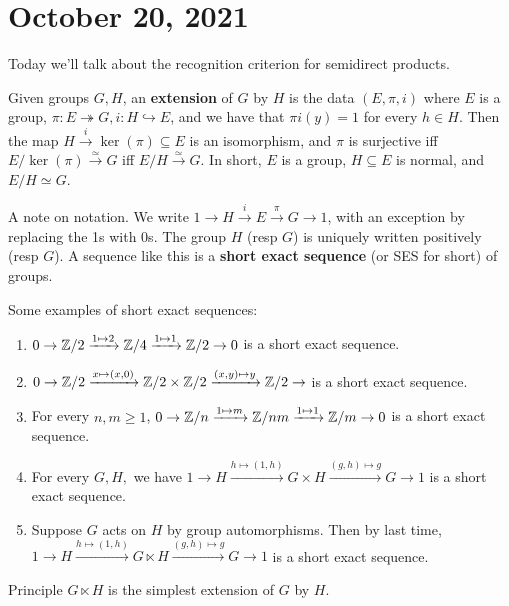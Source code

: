 \section{October 20, 2021} 
Today we'll talk about the recognition criterion for semidirect products.

\begin{definition}[]
    Given groups $G,H$, an \textbf{extension} of $G$ by $H$ is the data $(E,\pi,i)$ where $E$ is a group, $\pi \colon E \twoheadrightarrow G , i \colon H \hookrightarrow E $, and we have that $\pi i (y)=1$ for every $h \in H$. Then the map $H \xrightarrow i \ker (\pi) \subseteq E$ is an isomorphism, and $\pi$ is surjective iff $E /\ker (\pi) \xrightarrow{\simeq } G $ iff $E /H \xrightarrow{\simeq } G$. In short, $E$ is a group, $H \subseteq E$ is normal, and $E /H \simeq G$.
\end{definition}
\begin{note}
    A note on notation. We write $1 \to H \xrightarrow i E \xrightarrow{\pi} G \to 1$, with an exception by replacing the 1s with 0s. The group $H$ (resp $G$) is uniquely written positively (resp $G$). A sequence like this is a \textbf{short exact sequence} (or SES for short) of groups.
\end{note}
\begin{example}
    Some examples of short exact sequences:
    \begin{enumerate}[label=(\arabic*)]
    \setlength\itemsep{-.2em}
        \item $0 \to  \mathbb{Z} /2 \xrightarrow{1 \mapsto 2} \mathbb{Z}/4 \xrightarrow{1 \mapsto 1} \mathbb{Z} /2 \to 0$ is a short exact sequence.
        \item $0 \to  \mathbb{Z} /2 \xrightarrow{x \mapsto (x,0)} \mathbb{Z} /2 \times \mathbb{Z} /2 \xrightarrow{(x,y)\mapsto y} \mathbb{Z} /2 \to $ is a short exact sequence.
        \item For every $n,m \geq 1$, $0 \to \mathbb{Z}/n \xrightarrow{1 \mapsto  m} \mathbb{Z} / nm \xrightarrow{ 1 \mapsto  1} \mathbb{Z} / m \to 0$ is a short exact sequence.
        \item For every $G,H,$ we have $1 \to  H \xrightarrow{h \mapsto (1,h)} G \times H \xrightarrow{(g,h) \mapsto g} G \to 1$ is a short exact sequence.
        \item Suppose $G$ acts on $H$ by group automorphisms. Then by last time, $1 \to  H \xrightarrow{h \mapsto (1,h)} G \ltimes H \xrightarrow{(g,h) \mapsto g} G \to 1$ is a short exact sequence.
    \end{enumerate}
\end{example}
\begin{namedthing}{Principle} 
   $G\ltimes H$ is the simplest extension of $G$ by $H$. 
\end{namedthing}
